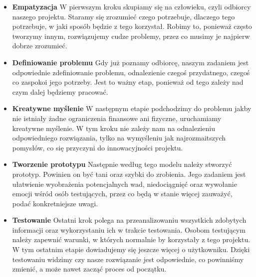 \documentclass[a4paper,titleauthor]{mwart}
\begin{document}
	\begin{itemize}
		\item \textbf {Empatyzacja}\newline \newline
		W pierwszym kroku skupiamy się na człowieku, czyli odbiorcy naszego projektu. Staramy się zrozumieć czego potrzebuje, dlaczego tego potrzebuje, w jaki sposób będzie z tego korzystał. Robimy to, ponieważ często tworzymy innym, rozwiązujemy cudze problemy, przez co musimy je najpierw dobrze zrozumieć. \newline
		\item \textbf{Definiowanie problemu}\newline \newline
		Gdy już poznamy odbiorcę, naszym zadaniem jest odpowiednie zdefiniowanie problemu, odnalezienie czegoś przydatnego, czegoś co zaspokoi jego potrzeby. Jest to ważny etap, ponieważ od tego zależy nad czym dalej będziemy pracować.\newline \newline
		\item\textbf{Kreatywne myślenie}\newline \newline
		W następnym etapie podchodzimy do problemu jakby nie istniały żadne ograniczenia finansowe ani fizyczne, uruchamiamy kreatywne myślenie. W tym kroku nie zależy nam na odnalezieniu odpowiedniego rozwiązania, tylko na wymyśleniu jak najrozmaitszych pomysłów, co się przyczyni do innowacyjności projektu.\newline
		\item\textbf{Tworzenie prototypu}\newline \newline
		Następnie według tego modelu należy stworzyć prototyp. Powinien on być tani oraz szybki do zrobienia. Jego zadaniem jest ułatwienie wyobrażenia potencjalnych wad, niedociągnięć oraz wywołanie emocji wśród osób testujących, przez co będą w stanie więcej zauważyć, podać konkretniejsze uwagi.\newline
		\item\textbf{Testowanie}\newline \newline
		Ostatni krok polega na przeanalizowaniu wszystkich zdobytych informacji oraz wykorzystaniu ich w trakcie testowania. Osobom testującym należy zapewnić warunki, w których normalnie by korzystały z tego projektu. W tym ostatnim etapie dowiadujemy się jeszcze więcej o użytkowniku. Dzięki testowaniu widzimy czy nasze rozwiązanie jest odpowiednie, co powinniśmy zmienić, a może nawet zacząć proces od początku.
	\end{itemize}
	
\end{document}
